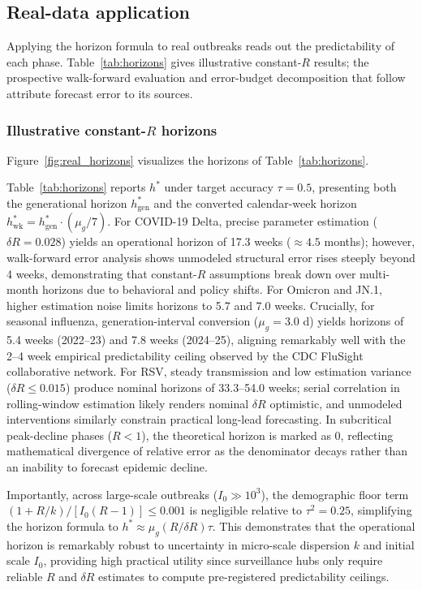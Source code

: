 \documentclass[review]{elsarticle}
\theoremstyle{plain}
\theoremstyle{definition}
\begin{document}
\subsection{Real-data application}

Applying the horizon formula to real outbreaks reads out the predictability of each phase. Table~\ref{tab:horizons} gives illustrative constant-$R$ results; the prospective walk-forward evaluation and error-budget decomposition that follow attribute forecast error to its sources.

\subsubsection{Illustrative constant-$R$ horizons}

Figure~\ref{fig:real_horizons} visualizes the horizons of Table~\ref{tab:horizons}.

Table~\ref{tab:horizons} reports $h^*$ under target accuracy $\tau=0.5$, presenting both the generational horizon $h^*_{\text{gen}}$ and the converted calendar-week horizon $h^*_{\text{wk}} = h^*_{\text{gen}} \cdot (\mu_g/7)$. For COVID-19 Delta, precise parameter estimation ($\delta R = 0.028$) yields an operational horizon of 17.3 weeks ($\approx 4.5$ months); however, walk-forward error analysis shows unmodeled structural error rises steeply beyond 4 weeks, demonstrating that constant-$R$ assumptions break down over multi-month horizons due to behavioral and policy shifts. For Omicron and JN.1, higher estimation noise limits horizons to 5.7 and 7.0 weeks. Crucially, for seasonal influenza, generation-interval conversion ($\mu_g = 3.0$ d) yields horizons of 5.4 weeks (2022--23) and 7.8 weeks (2024--25), aligning remarkably well with the 2--4 week empirical predictability ceiling observed by the CDC FluSight collaborative network. For RSV, steady transmission and low estimation variance ($\delta R \le 0.015$) produce nominal horizons of 33.3--54.0 weeks; serial correlation in rolling-window estimation likely renders nominal $\delta R$ optimistic, and unmodeled interventions similarly constrain practical long-lead forecasting. In subcritical peak-decline phases ($R<1$), the theoretical horizon is marked as 0, reflecting mathematical divergence of relative error as the denominator decays rather than an inability to forecast epidemic decline.

Importantly, across large-scale outbreaks ($I_0 \gg 10^3$), the demographic floor term $(1+R/k)/[I_0(R-1)] \le 0.001$ is negligible relative to $\tau^2 = 0.25$, simplifying the horizon formula to $h^* \approx \mu_g (R/\delta R)\tau$. This demonstrates that the operational horizon is remarkably robust to uncertainty in micro-scale dispersion $k$ and initial scale $I_0$, providing high practical utility since surveillance hubs only require reliable $R$ and $\delta R$ estimates to compute pre-registered predictability ceilings.
\end{document}
